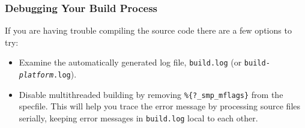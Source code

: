 \begin{appendices}
\subsubsection{Debugging Your Build Process}
If you are having trouble compiling the source code there are a few options to try:
\begin{itemize}
\item Examine the automatically generated log file, \texttt{build.log} (or \texttt{build-\textit{platform}.log}).
\item Disable multithreaded building by removing \verb+%{?_smp_mflags}+ from the specfile.
\subitem This will help you trace the error message by processing source files serially, keeping error messages in \texttt{build.log} local to each other.
\end{itemize}
\iffalse
\subsubsection{Building Main RPMs in a VM}
\label{subsubsec:VM_usage}
In an ideal configuration, you would build the RPMs in a self-contained VM or Docker Container. The problem with this ideal is that you would need to have a VM-local \texttt{git} repository, along with a full Xilinx install for the cross-compilers. Since the installation for each VM would be obnoxiously time consuming, the following shortcuts can be taken:
\begin{enumerate}
\item Install \texttt{sshfs} on the VM
\subitem \texttt{sudo yum install fuse-sshfs}
\subitem (There may have been a configuration thing I did here that I don't remember)
\item Create mount points
\subitem \texttt{mkdir /tmp/repo}
\subitem \texttt{mkdir -p /opt/Xilinx}
\item Mount your \texttt{git} repository from the host to the VM:
\subitem \verb+sshfs -o uid=$(id -u),gid=$(id -g)+\verb+ user@192.168.x.x:/data/user/repopath /tmp/repo+
\item Mount your Xilinx directory:
\subitem \verb+sshfs user@192.168.x.x:/opt/Xilinx /opt/Xilinx+
\item From within your checkout, e.g. \texttt{/tmp/repo}:
\subitem \verb+make driver cdk-all +\textbackslash
\subitem \verb+ OCPI_CROSS_BUILD_BIN_DIR=/opt/Xilinx/14.7/ISE_DS/EDK/gnu/arm/lin/bin+
\end{enumerate}
\fi

\newpage

\end{appendices}
